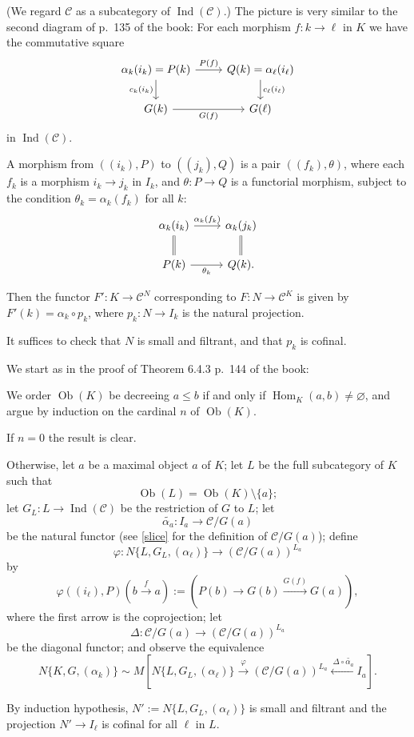 \documentclass[12pt]{article}
\theoremstyle{remark}%
\newcommand{\n}{\noindent}
\newcommand{\C}{\mathcal C}
\newcommand{\p}{\varphi}
\newcommand{\xr}{\xrightarrow}
\DeclareMathOperator{\h}{Hom}
\DeclareMathOperator{\Ind}{Ind}
\DeclareMathOperator{\Ob}{Ob}
\begin{document}
\n(We regard $\C$ as a subcategory of $\Ind(\C)$.) The picture is very similar to the second diagram of p.~135 of the book: For each morphism $f:k\to\ell$ in $K$ we have the commutative square  
$$ 
\begin{tikzcd} 
\alpha_k(i_k)=P(k)\ar{r}{P(f)}\ar{d}[swap]{c_k(i_k)}&Q(k)=\alpha_\ell(i_\ell)\ar{d}{c_\ell(i_\ell)}\\ 
G(k)\ar{r}[swap]{G(f)}&G(\ell) 
\end{tikzcd} 
$$ 
in $\Ind(\C)$. 

A morphism from $((i_k),P)$ to $((j_k),Q)$ is a pair $((f_k),\theta)$, where each $f_k$ is a morphism $i_k\to j_k$ in $I_k$, and $\theta:P\to Q$ is a functorial morphism, subject to the condition $\theta_k=\alpha_k(f_k)$ for all $k$: 
$$ 
\begin{tikzcd} 
\alpha_k(i_k)\ar{r}{\alpha_k(f_k)}\ar[equal]{d}&\alpha_k(j_k)\ar[equal]{d}\\ 
P(k)\ar{r}[swap]{\theta_k}&Q(k).
\end{tikzcd} 
$$ 

Then the functor $F':K\to\C^N$ corresponding to $F:N\to\C^K$ is given by $F'(k)=\alpha_k\circ p_k$, where $p_k:N\to I_k$ is the natural projection. 

It suffices to check that $N$ is small and filtrant, and that $p_k$ is cofinal. 

We start as in the proof of Theorem 6.4.3 p.~144 of the book: 

We order $\Ob(K)$ be decreeing $a\le b$ if and only if $\h_K(a,b)\neq\varnothing$, and argue by induction on the cardinal $n$ of $\Ob(K)$. 

If $n=0$ the result is clear. 

Otherwise, let $a$ be a maximal object $a$ of $K$; let $L$ be the full subcategory of $K$ such that 
$$
\Ob(L)=\Ob(K)\setminus\{a\};
$$ 
let $G_L:L\to\Ind(\C)$ be the restriction of $G$ to $L$; let 
$$
\widetilde{\alpha_a}:I_a\to\C/G(a)
$$ 
be the natural functor (see \eqref{slice} for the definition of $\C/G(a)$); define  
$$ 
\p:N\{L,G_L,(\alpha_\ell)\}\to(\C/G(a))^{L_a} 
$$ 
by 
$$
\p((i_\ell),P)\left(b\xr f a\right):=\left(P(b)\to G(b)\xr{G(f)}G(a)\right),
$$
where the first arrow is the coprojection; let 
$$
\Delta:\C/G(a)\to(\C/G(a))^{L_a}
$$ 
be the diagonal functor; and observe the equivalence 
$$ 
N\{K,G,(\alpha_k)\}\sim M\left[N\{L,G_L,(\alpha_\ell)\}\xrightarrow{\p}(\C/G(a))^{L_a}\xleftarrow{\ \Delta\circ\widetilde{\alpha_a}}I_a\right]. 
$$ 

By induction hypothesis, $N':=N\{L,G_L,(\alpha_\ell)\}$ is small and filtrant and the projection $N'\to I_\ell$ is cofinal for all $\ell$ in $L$. 
\end{document}
